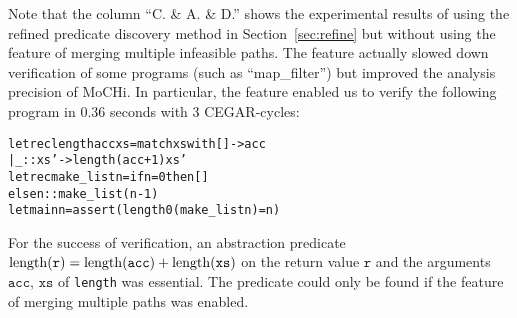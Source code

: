 Note that the column ``C. \& A. \& D.'' shows the experimental results
of using the refined predicate discovery method in
Section~\ref{sec:refine} but without using the feature of merging
multiple infeasible paths.  The feature actually slowed down
verification of some programs (such as ``map\_filter'') but improved the
analysis precision of MoCHi.  In particular, the feature enabled us to
verify the following program in 0.36 seconds with 3 CEGAR-cycles:
\vspace{-5pt}
\begin{alltt}
let rec length acc xs = match xs with [] -> acc
                      | _::xs' -> length (acc+1) xs'
let rec make_list n = if n = 0 then []
                      else n :: make_list (n-1)
let main n = assert (length 0 (make_list n) = n)
\end{alltt}
For the success of verification, an abstraction predicate
$\mathrm{length}(\mathtt{r}) = \mathrm{length}(\mathtt{acc}) + \mathrm{length}(\mathtt{xs})$ on
the return value $\mathtt{r}$ and the arguments $\mathtt{acc}$,
$\mathtt{xs}$ of \texttt{length} was essential.  The predicate could
only be found if the feature of merging multiple paths was enabled.

